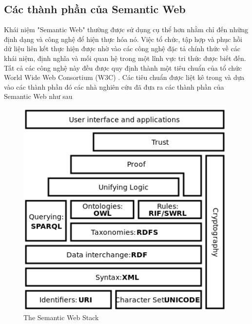 \subsection{Các thành phần của Semantic Web}
Khái niệm "Semantic Web" thường được sử dụng cụ thể hơn nhằm chỉ đến những định dạng và công nghệ để hiện thực hóa nó. Việc tổ chức, tập hợp và phục hồi dữ liệu liên kết thực hiện được nhờ vào các công nghệ đặc tả chính thức về các khái niệm, định nghĩa và mối quan hệ trong một lĩnh vực tri thức được biết đến. Tất cả các công nghệ này đều được quy định thành một tiêu chuẩn của tổ chức World Wide Web Consortium (W3C) . Các tiêu chuẩn được liệt kê trong \cite{semantic2} và dựa vào các thành phần đó các nhà nghiên cứu đã đưa ra các thành phần của Semantic Web như sau
\begin{figure}[h!]
	\centering
	\includegraphics[width=110mm]{Figures/semantic_web_stack.png}
	\caption{The Semantic Web Stack \label{overflow}}
\end{figure}
